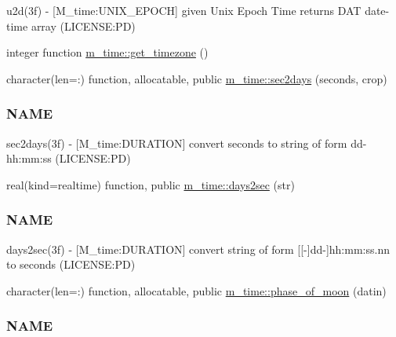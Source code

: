 \begin{DoxyCompactItemize}
\begin{DoxyCompactList}
u2d(3f) -\/ \mbox{[}M\+\_\+time\+:U\+N\+I\+X\+\_\+\+E\+P\+O\+CH\mbox{]} given Unix Epoch Time returns D\+AT date-\/time array (L\+I\+C\+E\+N\+SE\+:PD) \end{DoxyCompactList}\item 
integer function \mbox{\hyperlink{namespacem__time_a7903410a1d28bcdf3d33ab0c2d74b124}{m\+\_\+time\+::get\+\_\+timezone}} ()
\item 
character(len=\+:) function, allocatable, public \mbox{\hyperlink{namespacem__time_a7788285d79b8d58323b05e9a30a2d992}{m\+\_\+time\+::sec2days}} (seconds, crop)
\begin{DoxyCompactList}\small\item\em \subsubsection*{N\+A\+ME}

sec2days(3f) -\/ \mbox{[}M\+\_\+time\+:D\+U\+R\+A\+T\+I\+ON\mbox{]} convert seconds to string of form dd-\/hh\+:mm\+:ss (L\+I\+C\+E\+N\+SE\+:PD) \end{DoxyCompactList}\item 
real(kind=realtime) function, public \mbox{\hyperlink{namespacem__time_a99393c7906f1989f90ece03969224938}{m\+\_\+time\+::days2sec}} (str)
\begin{DoxyCompactList}\small\item\em \subsubsection*{N\+A\+ME}

days2sec(3f) -\/ \mbox{[}M\+\_\+time\+:D\+U\+R\+A\+T\+I\+ON\mbox{]} convert string of form \mbox{[}\mbox{[}-\/\mbox{]}dd-\/\mbox{]}hh\+:mm\+:ss.\+nn to seconds (L\+I\+C\+E\+N\+SE\+:PD) \end{DoxyCompactList}\item 
character(len=\+:) function, allocatable, public \mbox{\hyperlink{namespacem__time_ab8a976e2f113cc38b6df80974cee55dc}{m\+\_\+time\+::phase\+\_\+of\+\_\+moon}} (datin)
\begin{DoxyCompactList}\small\item\em \subsubsection*{N\+A\+ME}


\end{DoxyCompactList}
\end{DoxyCompactItemize}
